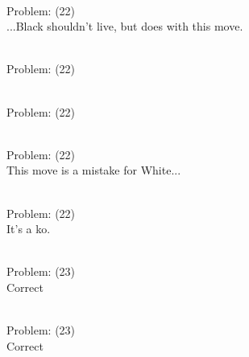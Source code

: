 \documentclass[11pt]{article}
\begin{document}
\begin{minipage}[t]{0.5\textwidth}
  {\centering
  
\\
Problem: (22)\\
...Black shouldn't live, but does with this move.\\
  }
\end{minipage}
\begin{minipage}[t]{0.5\textwidth}
  {\centering
  
\\
Problem: (22)\\
  }
\end{minipage}
\begin{minipage}[t]{0.5\textwidth}
  {\centering
  
\\
Problem: (22)\\
  }
\end{minipage}
\begin{minipage}[t]{0.5\textwidth}
  {\centering
  
\\
Problem: (22)\\
This move is a mistake for White...\\
  }
\end{minipage}
\begin{minipage}[t]{0.5\textwidth}
  {\centering
  
\\
Problem: (22)\\
It's a ko.\\
  }
\end{minipage}
\begin{minipage}[t]{0.5\textwidth}
  {\centering
  
\\
Problem: (23)\\
Correct\\
  }
\end{minipage}
\begin{minipage}[t]{0.5\textwidth}
  {\centering
  
\\
Problem: (23)\\
Correct\\
  }
\end{minipage}
\end{document}
